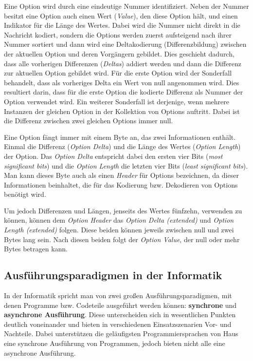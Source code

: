Eine Option wird durch eine eindeutige Nummer identifiziert. Neben der Nummer besitzt eine Option auch einen Wert (\textit{Value}), den diese Option hält, und einen Indikator für die Länge des Wertes. Dabei wird die Nummer nicht direkt in die Nachricht kodiert, sondern die Options werden zuerst aufsteigend nach ihrer Nummer sortiert und dann wird eine Deltakodierung (Differenzbildung) zwischen der aktuellen Option und deren Vorgängern gebildet. Dies geschieht dadurch, dass alle vorherigen Differenzen (\textit{Deltas}) addiert werden und dann die Differenz zur aktuellen Option gebildet wird. Für die erste Option wird der Sonderfall behandelt, dass als vorheriges Delta ein Wert von null angenommen wird. Dies resultiert darin, dass für die erste Option die kodierte Differenz als Nummer der Option verwendet wird. Ein weiterer Sonderfall ist derjenige, wenn mehrere Instanzen der gleichen Option in der Kollektion von Options auftritt. Dabei ist die Differenz zwischen zwei gleichen Options immer null.

Eine Option fängt immer mit einem Byte an, das zwei Informationen enthält. Einmal die Differenz (\textit{Option Delta}) und die Länge des Wertes (\textit{Option Length}) der Option. Das \textit{Option Delta} entspricht dabei den ersten vier Bits (\textit{most significant bits}) und die \textit{Option Length} die letzten vier Bits (\textit{least significant bits}). Man kann dieses Byte auch als einen \textit{Header} für Options bezeichnen, da dieser Informationen beinhaltet, die für das Kodierung bzw. Dekodieren von Options benötigt wird.

Um jedoch Differenzen und Längen, jenseits des Wertes fünfzehn, verwenden zu können, können dem \textit{Option Header} das \textit{Option Delta (extended)} und \textit{Option Length (extended)} folgen. Diese beiden können jeweils zwischen null und zwei Bytes lang sein. Nach diesen beiden folgt der \textit{Option Value}, der null oder mehr Bytes betragen kann.

\subsection{Ausführungsparadigmen in der Informatik}
\label{subsubsec:ausfuehrungsparadigmen-in-der-informatik}

In der Informatik spricht man von zwei großen Ausführungsparadigmen, mit denen Programme bzw. Codeteile ausgeführt werden können: \textbf{synchrone} und \textbf{asynchrone Ausführung}. Diese unterscheiden sich in wesentlichen Punkten deutlich voneinander und bieten in verschiedenen Einsatzszenarien Vor- und Nachteile. Dabei unterstützen die geläufigsten Programmiersprachen von Haus eine synchrone Ausführung von Programmen, jedoch bieten nicht alle eine asynchrone Ausführung.

